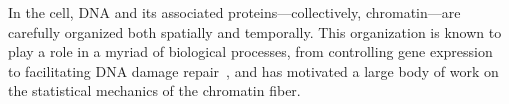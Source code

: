 \documentclass[%
 reprint,
superscriptaddress,
showpacs,preprintnumbers,
 amsmath,amssymb,
 aps,
 prl,
]{revtex4-1}
\begin{document}
\maketitle


In the cell, DNA and its associated proteins---collectively, chromatin---are
    carefully organized both spatially and temporally.
This organization is known to play a role in a myriad of biological processes,
    from controlling gene expression~\cite{hubner2013} to facilitating DNA
    damage repair~\cite{hauer2017,stadler2017}, and has motivated a large body
    of work on the statistical mechanics of the chromatin fiber.
\end{document}
